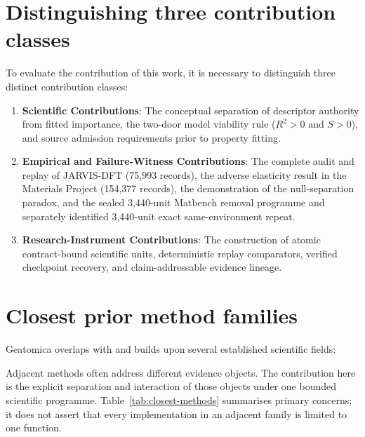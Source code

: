 \documentclass[11pt,a4paper,oneside]{report}
\begin{document}
\section{Distinguishing three contribution classes}
To evaluate the contribution of this work, it is necessary to distinguish three distinct contribution classes:
\begin{enumerate}
\item \textbf{Scientific Contributions}: The conceptual separation of descriptor authority from fitted importance, the two-door model viability rule ($R^2>0$ and $S>0$), and source admission requirements prior to property fitting.
\item \textbf{Empirical and Failure-Witness Contributions}: The complete audit and replay of JARVIS-DFT (75,993 records), the adverse elasticity result in the Materials Project (154,377 records), the demonstration of the null-separation paradox, and the sealed 3,440-unit Matbench removal programme and separately identified 3,440-unit exact same-environment repeat.
\item \textbf{Research-Instrument Contributions}: The construction of atomic contract-bound scientific units, deterministic replay comparators, verified checkpoint recovery, and claim-addressable evidence lineage.
\end{enumerate}

\section{Closest prior method families}
Geatomica overlaps with and builds upon several established scientific fields:

Adjacent methods often address different evidence objects. The contribution here is
the explicit separation and interaction of those objects under one bounded scientific
programme. Table~\ref{tab:closest-methods} summarises primary concerns; it does not
assert that every implementation in an adjacent family is limited to one function.
\end{document}
